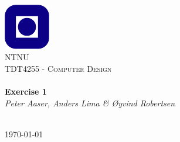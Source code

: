 \begin{titlepage}
\begin{center}
\includegraphics[width=0.15\textwidth]{img/NTNU.png}~\\[1cm]

\textsc{\LARGE NTNU}\\[1.5cm]

\textsc{\Large TDT4255 - Computer Design}\\[0.5cm]

\HRule \\[0.4cm]
{ \huge \bfseries Exercise 1}\\[0.5cm]
{\large \textit{Peter Aaser, Anders Lima \& Øyvind Robertsen}}\\[0.2cm]
\HRule \\[1.5cm]



\vfill

{\large \today}
\end{center}
\end{titlepage}
